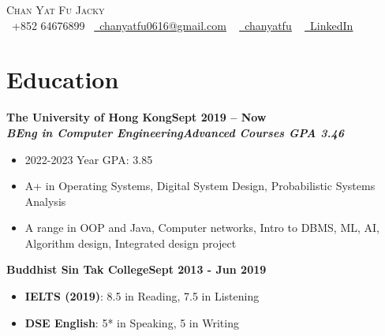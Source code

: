 \documentclass[a4paper,10pt]{article}
\begin{document}
\begin{center}
  {\Huge \scshape Chan Yat Fu Jacky} \\ \vspace{5pt}
  \small \raisebox{-0.1\height}\faPhone\ +852 64676899~ \href{mailto:chanyatfu0616@gmail.com}{\raisebox{-0.2\height}\faEnvelope\  \underline{chanyatfu0616@gmail.com}} ~
  \href{https://github.com/chanyatfu}{\raisebox{-0.2\height}\faGithub\ \underline{chanyatfu}} ~
  \href{https://www.linkedin.com/in/yat-fu-chan-255b59306/}{\raisebox{-0.2\height}\faLinkedin\ \underline{LinkedIn}}  ~
  \vspace{-3pt}
\end{center}

\newcommand*{\bb}[2]{{\small\bfseries#1\hfill{\small#2}}\\}
\newcommand*{\cc}[2]{{\bfseries\textit{\small#1}\hfill\textit{\small#2}}\\}
\newenvironment{tightitemize}{\begin{itemize}[leftmargin=2em,topsep=1pt,partopsep=1pt,noitemsep]\small}{\end{itemize}\vspace*{2pt}}

\section{Education}

\bb{The University of Hong Kong}{Sept 2019 -- Now}
\cc{BEng in Computer Engineering}{Advanced Courses GPA 3.46}
\begin{tightitemize}
  \item 2022-2023 Year GPA: 3.85
  \item A+ in Operating Systems, Digital System Design, Probabilistic Systems Analysis
  \item A range in OOP and Java, Computer networks, Intro to DBMS, ML, AI, Algorithm design, Integrated design project
\end{tightitemize}

\bb{Buddhist Sin Tak College}{Sept 2013 - Jun 2019}
\begin{tightitemize}
  \item \textbf{IELTS (2019)}: 8.5 in Reading, 7.5 in Listening
  \item \textbf{DSE English}: 5* in Speaking, 5 in Writing
\end{tightitemize}
\end{document}
